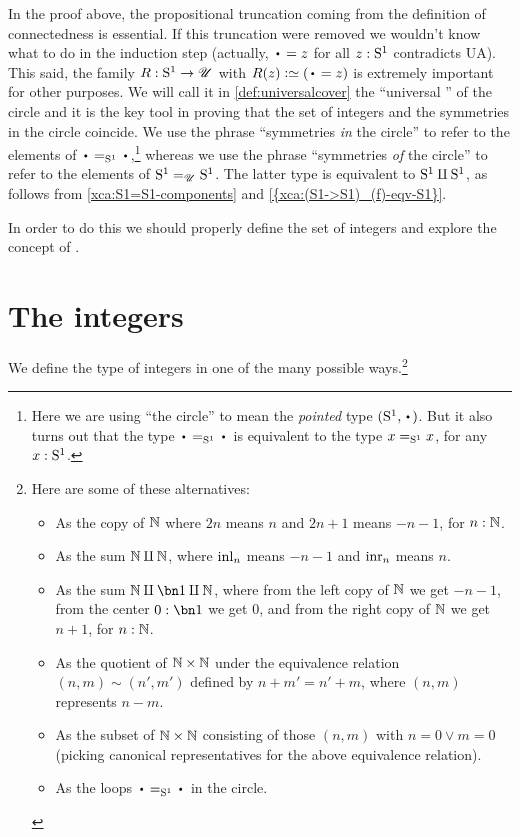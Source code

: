 In the proof above, the propositional truncation coming 
from the definition of connectedness is essential.
If this truncation were removed we wouldn't know what to do in
the induction step (actually, ${\base=z}$ for all $z:{\mathrm{S}^1}$ contradicts UA).
This said, the family $R:{\mathrm{S}^1}\to{\mathscr{U}}$ with $R(z)\defequi (\base=z)$ is extremely 
important for other purposes. We will call it in \cref{def:universalcover} the 
``universal \covering'' of the circle and it is the key tool in proving that 
the set of integers and the symmetries in the circle coincide.
We use the phrase ``symmetries \emph{in} the circle'' to refer to the elements of $\base=_{\Sc}\base$,\footnote{%
  Here we are using ``the circle'' to mean the
  \emph{pointed} type $(\Sc,\base)$.
  But it also turns out that the type $\base=_{\Sc}\base$ is
  equivalent to the type $x=_{{\mathrm{S}^1}}x$, for any $x:{\mathrm{S}^1}$.}
whereas we use the phrase ``symmetries \emph{of} the circle'' to refer to the elements of ${\mathrm{S}^1}=_{{\mathscr{U}}}{\mathrm{S}^1}$.
The latter type is equivalent to ${\mathrm{S}^1}\amalg{\mathrm{S}^1}$,
as follows from \cref{xca:S1=S1-components} and \cref{{xca:(S1->S1)_(f)-eqv-S1}}.



In order to do this we should properly define the set of integers 
and explore the concept of \coverings.

\section{The integers}
\label{sec:integers}

We define the type of integers in one of the many possible ways.\footnote{%
  Here are some of these alternatives:
  \begin{itemize}
  \item As the copy of $\mathbb{N}$ where $2n$ means $n$ and $2n+1$ means $-n-1$, for $n:\mathbb{N}$.
  \item As the sum $\mathbb{N}\amalg\mathbb{N}$, where $\inl{n}$ means $-n-1$ and $\inr{n}$ means $n$.
  \item As the sum $\NN\coprod\bn1\coprod\NN$, where from the left copy of $\mathbb{N}$ we get $-n-1$, from the center $0:\bn1$ we get $0$, and from the right copy of $\mathbb{N}$ we get $n+1$, for $n:\mathbb{N}$.
  \item As the quotient of $\mathbb{N}\times\mathbb{N}$ under the equivalence relation
    $(n,m) \sim (n',m')$ defined by $n+m' = n'+m$,
    where $(n,m)$ represents $n-m$.
  \item As the subset of $\mathbb{N}\times\mathbb{N}$ consisting of those $(n,m)$ with $n=0\lor m=0$ (picking canonical representatives for the above equivalence relation).
  \item As the loops $\base=_\Sc\base$ in the circle. %
  \end{itemize}}

